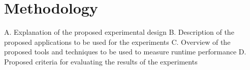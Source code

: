 \chapter{Methodology}
A. Explanation of the proposed experimental design
B. Description of the proposed applications to be used for the experiments
C. Overview of the proposed tools and techniques to be used to measure runtime performance
D. Proposed criteria for evaluating the results of the experiments